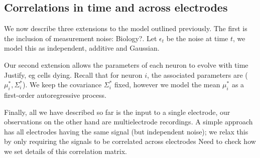 \subsection{Correlations in time and across electrodes}
We now describe three extensions to the model outlined previously. The first is the inclusion of measurement noise: 
{\color{red} Biology?}. Let $\epsilon_t$ be the noise at time $t$, we model this as independent, additive and Gaussian.

Our second extension allows the parameters of each neuron to evolve with time {\color{red} Justify, eg cells dying}. Recall that for neuron $i$, the 
associated parameters are ($\mu^*_i, \Sigma^*_i$). We keep the covariance $\Sigma^*_i$ fixed, however we model the mean $\mu^*_i$ as a first-order
autoregressive process. 

Finally, all we have described so far is the input to a single electrode, our observations on the other hand are multielectrode recordings. 
A simple approach has all electrodes having the same signal (but independent noise); we relax this by only requiring the signals to be
correlated across electrodes {\color{red} Need to check how we set details of this correlation matrix}.
